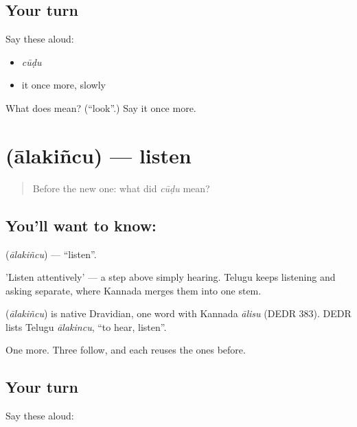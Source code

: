 \subsection*{Your turn}
Say these aloud:

\begin{itemize}
\raggedright
  \item \emph{cūḍu}
  \item it once more, slowly
\end{itemize}

\begin{tcolorbox}[breakable,colback=teal!4,colframe=teal!35!black,title={Before you move on}]
What does  mean? (\textquotedblleft{}look\textquotedblright{}.) Say it once more.
\end{tcolorbox}
\section[\texorpdfstring{\te{ఆలకించు} (ālakiñcu)}{ఆలకించు (ālakiñcu)}]{ (ālakiñcu) — listen}

\label{lesson:TE-C44-listen}



\begin{quote}
Before the new one: what did \emph{cūḍu} mean?
\end{quote}

\subsection*{You'll want to know: }
\textbf{} (\emph{ālakiñcu}) — \textquotedblleft{}listen\textquotedblright{}.

'Listen attentively' — a step above simply hearing. Telugu keeps listening and asking separate, where Kannada merges them into one stem.

\begin{cousinweb}
\textbf{} (\emph{ālakiñcu}) is native Dravidian, one word with Kannada \emph{ālisu} (DEDR 383). DEDR lists Telugu \emph{ālakincu}, \textquotedblleft{}to hear, listen\textquotedblright{}.
\end{cousinweb}

\begin{grammarlens}[title={What you've built}]
One more. Three follow, and each reuses the ones before.
\end{grammarlens}

\subsection*{Your turn}
Say these aloud:

